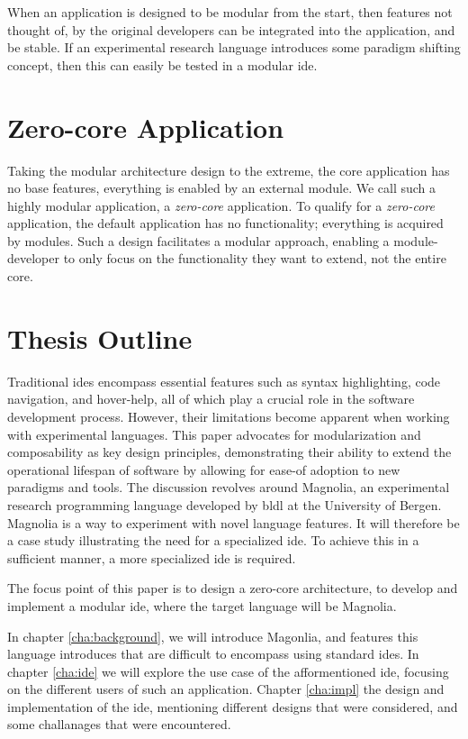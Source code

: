 \begin{hyp} \label{hyp:modular}
  When an application is designed to be modular from the start, then features
  not thought of, by the original developers can be integrated into the
  application, and be stable. If an experimental research language introduces
  some paradigm shifting concept, then this can easily be tested in a modular
  \gls*{ide}.
\end{hyp}

\section{Zero-core Application}

Taking the modular architecture design to the extreme, the core application has
no base features, everything is enabled by an external module. We call such a
highly modular application, a \textit{zero-core} application. To qualify for a
\textit{zero-core} application, the default application has no functionality;
everything is acquired by modules. Such a design facilitates a modular approach,
enabling a module-developer to only focus on the functionality they want to
extend, not the entire core.

\section{Thesis Outline}

Traditional \gls*{ide}s encompass essential features such as syntax highlighting,
code navigation, and hover-help, all of which play a crucial role in the
software development process. However, their limitations become apparent when
working with experimental languages. This paper advocates for modularization and
composability as key design principles, demonstrating their ability to extend
the operational lifespan of software by allowing for ease-of adoption to new
paradigms and tools. The discussion revolves around Magnolia, an experimental
research programming language developed by \gls*{bldl} at the University of
Bergen. Magnolia is a way to experiment with novel language features. It will
therefore be a case study illustrating the need for a specialized \gls*{ide}. To
achieve this in a sufficient manner, a more specialized \gls*{ide} is required.

The focus point of this paper is to design a zero-core architecture, to develop
and implement a modular \gls*{ide}, where the target language will be Magnolia.

In chapter \ref{cha:background}, we will introduce Magonlia, and features this
language introduces that are difficult to encompass using standard \gls*{ide}s.
In chapter \ref{cha:ide} we will explore the use case of the afformentioned
\gls*{ide}, focusing on the different users of such an application. Chapter
\ref{cha:impl} the design and implementation of the \gls*{ide}, mentioning
different designs that were considered, and some challanages that were
encountered.
